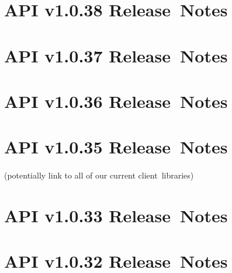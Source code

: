 \documentclass{memoir}%
\begin{document}
%
\section*{API v1.0.38 Release~Notes}%
\paragraph*{}%

%
\section*{API v1.0.37 Release~Notes}%
\paragraph*{}%

%
\section*{API v1.0.36 Release~Notes}%
\paragraph*{}%

%
\section*{API v1.0.35 Release~Notes}%
\paragraph*{}%

%
\paragraph*{}%
(potentially link to all of our current client~libraries)

%
\section*{API v1.0.33 Release~Notes}%
\paragraph*{}%

%
\section*{API v1.0.32 Release~Notes}%
\paragraph*{}%
\end{document}
